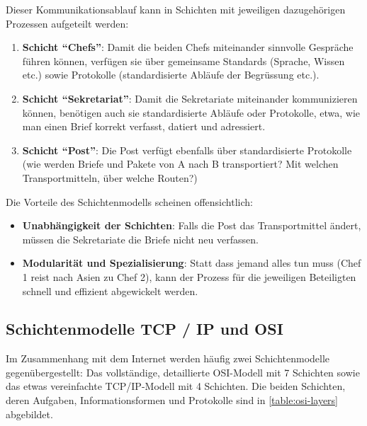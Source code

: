 Dieser Kommunikationsablauf kann in Schichten mit jeweiligen dazugehörigen Prozessen aufgeteilt werden:
\begin{enumerate}
	\item \textbf{Schicht \enquote{Chefs}}: Damit die beiden Chefs miteinander sinnvolle Gespräche führen können, verfügen sie über gemeinsame Standards (Sprache, Wissen etc.) sowie Protokolle (standardisierte Abläufe der Begrüssung etc.).
	\item \textbf{Schicht \enquote{Sekretariat}}: Damit die Sekretariate miteinander kommunizieren können, benötigen auch sie standardisierte Abläufe oder Protokolle, etwa, wie man einen Brief korrekt verfasst, datiert und adressiert.
	\item \textbf{Schicht \enquote{Post}}: Die Post verfügt ebenfalls über standardisierte Protokolle (wie werden Briefe und Pakete von A nach B transportiert? Mit welchen Transportmitteln, über welche Routen?)
\end{enumerate}
Die Vorteile des Schichtenmodells scheinen offensichtlich:
\begin{itemize}
	\item \textbf{Unabhängigkeit der Schichten}: Falls die Post das Transportmittel ändert, müssen die Sekretariate die Briefe nicht neu verfassen.
	\item \textbf{Modularität und Spezialisierung}: Statt dass jemand alles tun muss (Chef 1 reist nach Asien zu Chef 2), kann der Prozess für die jeweiligen Beteiligten schnell und effizient abgewickelt werden.
\end{itemize}

\subsection{\texorpdfstring{Schichtenmodelle \acrshort{TCP} / \acrshort{IP} und \acrshort{OSI}}{TCP / IP und OSI}}

Im Zusammenhang mit dem Internet werden häufig zwei Schichtenmodelle gegenübergestellt: Das vollständige, detaillierte \acrfull{OSI}-Modell mit 7 Schichten sowie das etwas vereinfachte \acrshort{TCP}/\acrshort{IP}-Modell mit 4 Schichten. Die beiden Schichten, deren Aufgaben, Informationsformen und Protokolle sind in \cref{table:osi-layers} abgebildet.


\begin{table}[H]
	\centering
	\footnotesize
	
	\caption{Internet-Schichten-Modelle \gls{OSI} und \gls{TCP}/\gls{IP} sowie deren wichtigste Aufgaben, Informationsformen, Geräte und Protokolle}
	\label{table:osi-layers}
\end{table}


